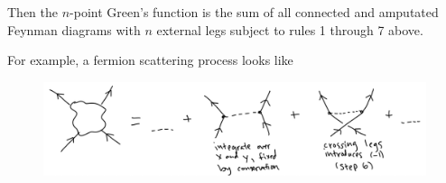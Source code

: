 \noindent Then the $n$-point Green's function is the sum of all connected and amputated Feynman diagrams with $n$ external legs subject to rules 1 through 7 above.

\noindent For example, a fermion scattering process looks like

\begin{figure}[H]\centering \includegraphics[scale=0.5]{images/fermionscattering.png}  \end{figure}